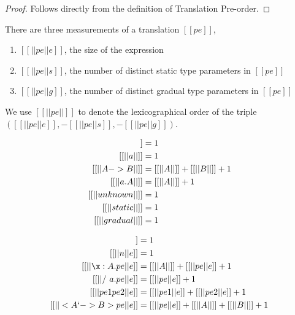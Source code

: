 \propparalpha*
\begin{proof}
Follows directly from the definition of Translation Pre-order.
\end{proof}

\begin{definition}
  There are three measurements of a translation $[[pe]]$,
  \begin{enumerate}
  \item $[[ ||pe||e]]$, the size of the expression 
  \item $[[ ||pe||s ]]$, the number of distinct static type parameters in $[[pe]]$
  \item $[[ ||pe||g ]]$, the number of distinct gradual type parameters in $[[pe]]$
  \end{enumerate}
  We use $[[ ||pe|| ]]$ to denote the lexicographical order of the triple
  $([[ ||pe||e ]], -[[ ||pe||s ]], -[[ ||pe||g ]])$.
\end{definition}

\begin{definition}

  \begin{align*}
    [[ || int ||  ]] &= 1 \\
    [[ || a ||  ]] &= 1 \\
    [[ || A -> B  ||  ]] &= [[ || A || ]] + [[ || B || ]] + 1 \\
    [[ || \/a . A ||  ]] &= [[ || A || ]] + 1 \\
    [[ || unknown ||  ]] &= 1 \\
    [[ || static ||  ]] &= 1 \\
    [[ || gradual ||  ]] &= 1
  \end{align*}

\end{definition}

\begin{definition}

  \begin{align*}
    [[ || x ||e  ]] &= 1 \\
    [[ || n ||e  ]] &= 1 \\
    [[ || \x : A . pe ||e  ]] &= [[ || A || ]] + [[ || pe ||e ]] + 1 \\
    [[ || /\ a. pe ||e  ]] &= [[ || pe ||e ]] + 1 \\
    [[ || pe1 pe2 ||e  ]] &= [[ || pe1 ||e ]] + [[  || pe2 ||e ]] + 1 \\
    [[ || < A `-> B> pe ||e  ]] &= [[ || pe ||e ]] + [[  || A || ]] + [[  || B || ]] + 1 \\
  \end{align*}

\end{definition}


